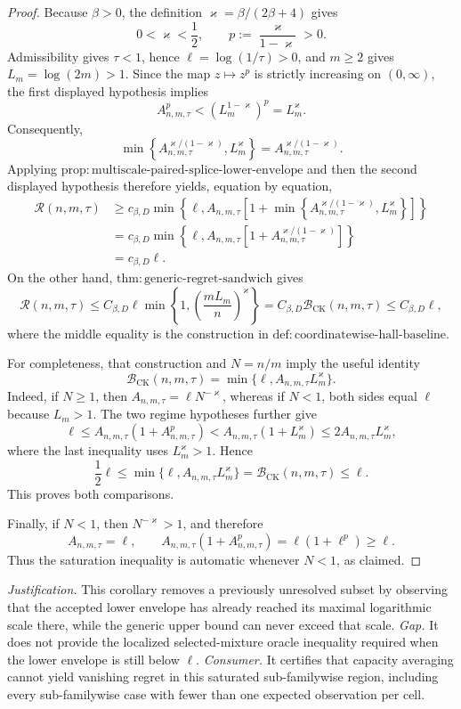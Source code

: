 \documentclass{article}
\begin{document}
\begin{proof}
Because \(\beta>0\), the definition \(\varkappa=\beta/(2\beta+4)\) gives
\[
0<\varkappa<\frac12,
\qquad
p:=\frac{\varkappa}{1-\varkappa}>0.
\]
Admissibility gives \(\tau<1\), hence \(\ell=\log(1/\tau)>0\), and \(m\ge2\) gives \(L_m=\log(2m)>1\). Since the map \(z\mapsto z^p\) is strictly increasing on \((0,\infty)\), the first displayed hypothesis implies
\[
A_{n,m,\tau}^{p}
<\left(L_m^{1-\varkappa}\right)^p
=L_m^{\varkappa}.
\]
Consequently,
\[
\min\left\{A_{n,m,\tau}^{\varkappa/(1-\varkappa)},L_m^{\varkappa}\right\}
=A_{n,m,\tau}^{\varkappa/(1-\varkappa)}.
\]
Applying \(\mathrm{prop{:}multiscale\text{-}paired\text{-}splice\text{-}lower\text{-}envelope}\) and then the second displayed hypothesis therefore yields, equation by equation,
\[
\begin{aligned}
\mathcal R(n,m,\tau)
&\ge c_{\beta,D}\min\!\left\{\ell,
A_{n,m,\tau}\left[1+
\min\!\left\{A_{n,m,\tau}^{\varkappa/(1-\varkappa)},L_m^{\varkappa}\right\}\right]\right\}\\
&=c_{\beta,D}\min\!\left\{\ell,
A_{n,m,\tau}\left[1+A_{n,m,\tau}^{\varkappa/(1-\varkappa)}\right]\right\}\\
&=c_{\beta,D}\ell.
\end{aligned}
\]
On the other hand, \(\mathrm{thm{:}generic\text{-}regret\text{-}sandwich}\) gives
\[
\mathcal R(n,m,\tau)
\le C_{\beta,D}\ell
\min\left\{1,\left(\frac{mL_m}{n}\right)^{\varkappa}\right\}
=C_{\beta,D}\mathcal B_{\mathrm{CK}}(n,m,\tau)
\le C_{\beta,D}\ell,
\]
where the middle equality is the construction in \(\mathrm{def{:}coordinatewise\text{-}hall\text{-}baseline}\).

For completeness, that construction and \(N=n/m\) imply the useful identity
\[
\mathcal B_{\mathrm{CK}}(n,m,\tau)
=\min\{\ell,A_{n,m,\tau}L_m^{\varkappa}\}.
\]
Indeed, if \(N\ge1\), then \(A_{n,m,\tau}=\ell N^{-\varkappa}\), whereas if \(N<1\), both sides equal \(\ell\) because \(L_m>1\). The two regime hypotheses further give
\[
\ell
\le A_{n,m,\tau}\left(1+A_{n,m,\tau}^{p}\right)
<A_{n,m,\tau}(1+L_m^{\varkappa})
\le2A_{n,m,\tau}L_m^{\varkappa},
\]
where the last inequality uses \(L_m^{\varkappa}>1\). Hence
\[
\frac12\ell
\le\min\{\ell,A_{n,m,\tau}L_m^{\varkappa}\}
=\mathcal B_{\mathrm{CK}}(n,m,\tau)
\le\ell.
\]
This proves both comparisons.

Finally, if \(N<1\), then \(N^{-\varkappa}>1\), and therefore
\[
A_{n,m,\tau}=\ell,
\qquad
A_{n,m,\tau}(1+A_{n,m,\tau}^{p})
=\ell(1+\ell^p)\ge\ell.
\]
Thus the saturation inequality is automatic whenever \(N<1\), as claimed.
\end{proof}
\par\smallskip\noindent \textit{Justification.} This corollary removes a previously unresolved subset by observing that the accepted lower envelope has already reached its maximal logarithmic scale there, while the generic upper bound can never exceed that scale. \textit{Gap.} It does not provide the localized selected-mixture oracle inequality required when the lower envelope is still below \(\ell\). \textit{Consumer.} It certifies that capacity averaging cannot yield vanishing regret in this saturated sub-familywise region, including every sub-familywise case with fewer than one expected observation per cell.
\end{document}
